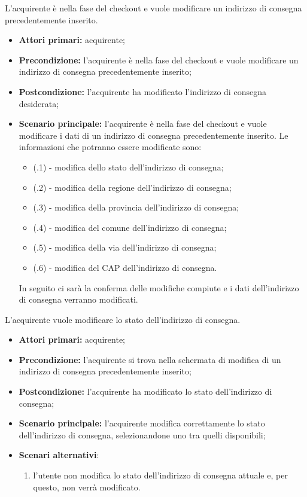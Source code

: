 L'acquirente è nella fase del checkout e vuole modificare un indirizzo di consegna precedentemente inserito.
\begin{itemize}
    \item \textbf{Attori primari:} acquirente;
    \item \textbf{Precondizione:} l'acquirente è nella fase del checkout e vuole modificare un indirizzo di consegna precedentemente inserito;
    \item \textbf{Postcondizione:} l'acquirente ha modificato l'indirizzo di consegna desiderata;
    \item \textbf{Scenario principale:} l'acquirente è nella fase del checkout e vuole modificare i dati di un indirizzo di consegna precedentemente inserito. Le informazioni che potranno essere modificate sono:
    \begin{itemize}
        \item (\actualUC.1) - modifica dello stato dell'indirizzo di consegna;
		\item (\actualUC.2) - modifica della regione dell'indirizzo di consegna;
		\item (\actualUC.3) - modifica della provincia dell'indirizzo di consegna;
		\item (\actualUC.4) - modifica del comune dell'indirizzo di consegna;
		\item (\actualUC.5) - modifica della via dell'indirizzo di consegna;
		\item (\actualUC.6) - modifica del CAP dell'indirizzo di consegna.
    \end{itemize}
    In seguito ci sarà la conferma delle modifiche compiute e i dati dell'indirizzo di consegna verranno modificati.
\end{itemize}

\resetSubUC

L'acquirente vuole modificare lo stato dell'indirizzo di consegna.
\begin{itemize}
    \item \textbf{Attori primari:} acquirente;
    \item \textbf{Precondizione:} l'acquirente si trova nella schermata di modifica di un indirizzo di consegna precedentemente inserito;
    \item \textbf{Postcondizione:} l'acquirente ha modificato lo stato dell'indirizzo di consegna;
    \item \textbf{Scenario principale:} l'acquirente modifica correttamente lo stato dell'indirizzo di consegna, selezionandone uno tra quelli disponibili;
    \item \textbf{Scenari alternativi}:
    \begin{enumerate}[label=\lett]
        \item l'utente non modifica lo stato dell'indirizzo di consegna attuale e, per questo, non verrà modificato.
    \end{enumerate}
\end{itemize}

